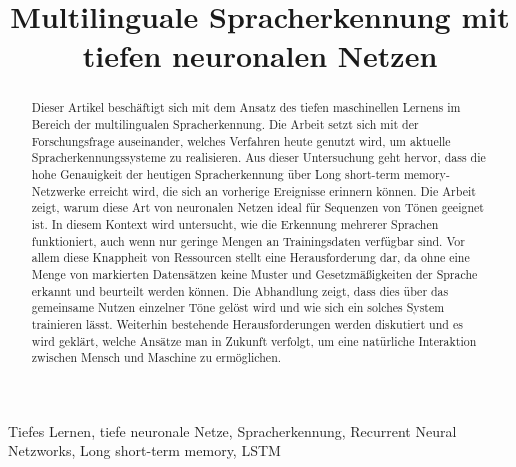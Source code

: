 \documentclass[conference]{IEEEtran}
\begin{document}
	
	\title{Multilinguale Spracherkennung mit tiefen neuronalen
	Netzen\\
	}
	
	\author{
		\and
		\and
	
	}
	
	\maketitle
	
	\begin{abstract}
	Dieser Artikel beschäftigt sich mit dem Ansatz des tiefen maschinellen Lernens im Bereich der multilingualen Spracherkennung.	Die Arbeit setzt sich mit der Forschungsfrage auseinander, welches Verfahren heute genutzt wird, um aktuelle Spracherkennungssysteme zu realisieren. Aus dieser Untersuchung geht hervor, dass die hohe Genauigkeit der heutigen Spracherkennung über Long short-term memory-Netzwerke erreicht wird, die sich an vorherige Ereignisse erinnern können. Die Arbeit zeigt, warum diese Art von neuronalen Netzen ideal für Sequenzen von Tönen geeignet ist. In diesem Kontext wird untersucht, wie die Erkennung mehrerer Sprachen funktioniert, auch wenn nur geringe Mengen an Trainingsdaten verfügbar sind. Vor allem diese Knappheit von Ressourcen stellt eine Herausforderung dar, da ohne eine Menge von markierten Datensätzen keine Muster und Gesetzmäßigkeiten der Sprache erkannt und beurteilt werden können. Die Abhandlung zeigt, dass dies über das gemeinsame Nutzen einzelner Töne gelöst wird und wie sich ein solches System trainieren lässt. Weiterhin bestehende Herausforderungen werden diskutiert und es wird geklärt, welche Ansätze man in Zukunft verfolgt, um eine natürliche Interaktion zwischen Mensch und Maschine zu ermöglichen.
	\end{abstract}
	
	\begin{IEEEkeywords}
		Tiefes Lernen, tiefe neuronale Netze, Spracherkennung, Recurrent Neural Netzworks, Long short-term memory, LSTM 
	\end{IEEEkeywords}
	

	
	
	
	
	
	
	
	
	
	
	
\end{document}
